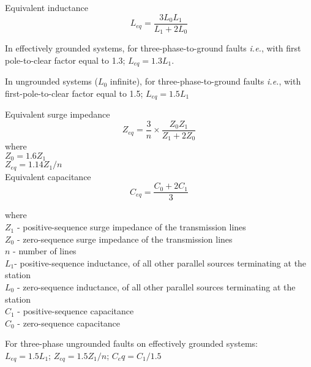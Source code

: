Equivalent inductance
\begin{equation}\label{eq:3.1}
L_{eq} = \frac{3 L_0 L_1}{L_1 + 2 L_0}
\end{equation}

In effectively grounded systems, for three-phase-to-ground faults \textit{i.e.}, with first pole-to-clear factor equal to 1.3; $L_{eq} = 1.3 L_1$.

In ungrounded systems ($L_0$ infinite), for three-phase-to-ground faults \textit{i.e.}, with first-pole-to-clear factor equal to 1.5; $L_{eq} = 1.5 L_1$

Equivalent surge impedance
\begin{equation}\label{eq:3.2}
Z_{eq} = \frac{3}{n} \times \frac{Z_0 Z_1}{Z_1 + 2 Z_0}
\end{equation}
where\\
$Z_0 = 1.6 Z_1$\\
$Z_{eq} = 1.14 Z_1 / n $\\

Equivalent capacitance
\begin{equation}\label{eq:3.3}
C_{eq} = \frac{C_0 + 2 C_1}{3}
\end{equation}

where\\
$Z_1$ - positive-sequence surge impedance of the transmission lines\\
$Z_0$ - zero-sequence surge impedance of the transmission lines \\
$n$ - number of lines\\
$L_1$- positive-sequence inductance, of all other parallel sources terminating at the station \\
$L_0$ - zero-sequence inductance, of all other parallel sources terminating at the station\\
$C_1$ - positive-sequence capacitance\\
$C_0$ - zero-sequence capacitance

For three-phase ungrounded faults on effectively grounded systems:\\
$L_{eq} = 1.5 L_1$; $Z_{eq} = 1.5 Z_1 / n$; $C_eq = C_1 / 1.5$\\

